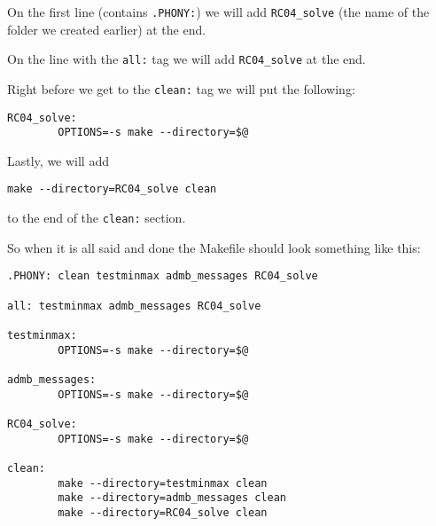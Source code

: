 \documentclass{article}
\begin{document}
On the first line (contains \verb".PHONY:") we will add \verb"RC04_solve" (the name of the
folder we created earlier) at the end.

On the line with the \verb"all:" tag we will add \verb"RC04_solve" at the end.

Right before we get to the \verb"clean:" tag we will put the following:
\begin{verbatim}
RC04_solve:
        OPTIONS=-s make --directory=$@
\end{verbatim}

Lastly, we will add
\begin{verbatim}
make --directory=RC04_solve clean
\end{verbatim}
to the end of the \verb"clean:" section.

So when it is all said and done the Makefile should look something like this:
\begin{verbatim}
.PHONY: clean testminmax admb_messages RC04_solve

all: testminmax admb_messages RC04_solve

testminmax:
        OPTIONS=-s make --directory=$@

admb_messages:
        OPTIONS=-s make --directory=$@

RC04_solve:
        OPTIONS=-s make --directory=$@

clean:
        make --directory=testminmax clean
        make --directory=admb_messages clean
        make --directory=RC04_solve clean
\end{verbatim}
\end{document}

